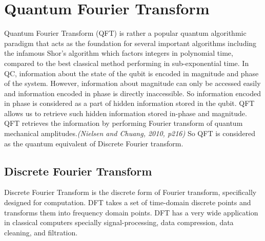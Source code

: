 \section{Quantum Fourier Transform}
Quantum Fourier Transform (QFT) is rather a popular quantum algorithmic paradigm that acts as the foundation for several important algorithms including the infamous Shor's algorithm which factors integers in polynomial time, compared to the best classical method performing in sub-exponential time.\cite{lin2014} In \acrshort{QC}, information about the state of the qubit is encoded in magnitude and phase of the system. However, information about magnitude can only be accessed easily and information encoded in phase is directly inaccessible. So information encoded in phase is considered as a part of hidden information stored in the qubit. QFT allows us to retrieve such hidden information stored in-phase and magnitude\cite{johnston2019}. QFT retrieves the information by performing Fourier transform of quantum mechanical amplitudes.\cite{Nielsen2002}\emph{(Nielsen and Chuang, 2010, p216)} So QFT is considered as the quantum equivalent of Discrete Fourier transform.

\subsection{Discrete Fourier Transform}
Discrete Fourier Transform is the discrete form of Fourier transform, specifically designed for computation. DFT takes a set of time-domain discrete points and transforms them into frequency domain points. DFT has a very wide application in classical computers specially signal-processing, data compression, data cleaning, and filtration.

